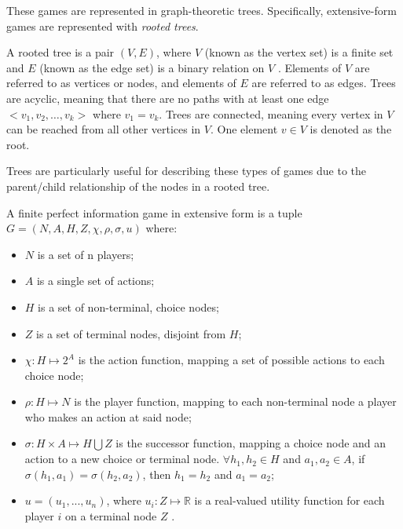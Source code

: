 These games are represented in graph-theoretic trees. Specifically, extensive-form games are represented with \textit{rooted trees}.
\begin{define}
  A rooted tree is a pair $(V, E)$, where $V$ (known as the vertex set) is a finite set and $E$ (known as the edge set) is a binary relation on $V$ \cite{corm09}. Elements of $V$ are referred to as vertices or nodes, and elements of $E$ are referred to as edges. Trees are acyclic, meaning that there are no paths with at least one edge $<v_1, v_2, \dots, v_k>$ where $v_1=v_k$. Trees are connected, meaning every vertex in $V$ can be reached from all other vertices in $V$. One element $v\in V$ is denoted as the root.
\end{define}

Trees are particularly useful for describing these types of games due to the parent/child relationship of the nodes in a rooted tree. 

\begin{define}
  A finite perfect information game in extensive form is a tuple $G = (N, A, H, Z, \chi, \rho, \sigma, u)$ where:
  \begin{itemize}
  \item $N$ is a set of n players;
  \item $A$ is a single set of actions;
  \item $H$ is a set of non-terminal, choice nodes;
  \item $Z$ is a set of terminal nodes, disjoint from $H$;
  \item $\chi: H\mapsto 2^A$ is the action function, mapping a set of possible actions to each choice node;
  \item $\rho: H\mapsto N$ is the player function, mapping to each non-terminal node a player who makes an action at said node;
  \item $\sigma: H\times A\mapsto H\bigcup Z$ is the successor function, mapping a choice node and an action to a new choice or terminal node. $\forall h_1, h_2\in H$ and $a_1, a_2\in A$, if $\sigma(h_1, a_1)=\sigma(h_2, a_2)$, then $h_1=h_2$ and $a_1=a_2$;
  \item $u=(u_1,...,u_n)$, where $u_i:Z\mapsto \mathbb{R}$ is a real-valued utility function for each player $i$ on a terminal node $Z$ \cite{shoh09}.
  \end{itemize}
\end{define}

